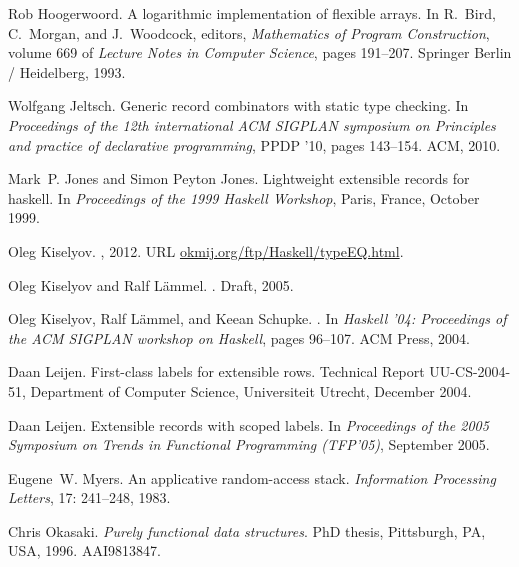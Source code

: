 \documentclass[natbib]{sigplanconf}
\begin{document}
\begin{flushleft}
\begin{thebibliography}{24}
Rob Hoogerwoord.
\newblock A logarithmic implementation of flexible arrays.
\newblock In R.~Bird, C.~Morgan, and J.~Woodcock, editors, \emph{Mathematics of
  Program Construction}, volume 669 of \emph{Lecture Notes in Computer
  Science}, pages 191--207. Springer Berlin / Heidelberg, 1993.

Wolfgang Jeltsch.
\newblock Generic record combinators with static type checking.
\newblock In \emph{Proceedings of the 12th international ACM SIGPLAN symposium
  on Principles and practice of declarative programming}, PPDP '10, pages
  143--154. ACM, 2010.

Mark~P. Jones and Simon {Peyton Jones}.
\newblock Lightweight extensible records for haskell.
\newblock In \emph{Proceedings of the 1999 Haskell Workshop}, {P}aris,
  {F}rance, October 1999.

Oleg Kiselyov.
, 2012.
\newblock URL \url{okmij.org/ftp/Haskell/typeEQ.html}.

Oleg Kiselyov and Ralf L{\"a}mmel.
.
\newblock Draft, 2005.

Oleg Kiselyov, Ralf L{\"a}mmel, and Keean Schupke.
.
\newblock In \emph{{Haskell '04: Proceedings of the ACM SIGPLAN workshop on
  Haskell}}, pages 96--107. ACM Press, 2004.

Daan Leijen.
\newblock First-class labels for extensible rows.
\newblock Technical Report UU-CS-2004-51, Department of Computer Science,
  Universiteit Utrecht, December 2004.

Daan Leijen.
\newblock Extensible records with scoped labels.
\newblock In \emph{Proceedings of the 2005 Symposium on Trends in Functional
  Programming (TFP'05)}, September 2005.

Eugene~W. Myers.
\newblock An applicative random-access stack.
\newblock \emph{Information Processing Letters}, 17: 241--248, 1983.

Chris Okasaki.
\newblock \emph{Purely functional data structures}.
\newblock PhD thesis, Pittsburgh, PA, USA, 1996.
\newblock AAI9813847.


\end{thebibliography}
\end{flushleft}
\end{document}
